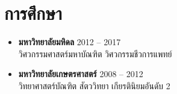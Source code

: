 \section{\sc การศึกษา}

\begin{itemize}[leftmargin=0cm, label={}]

\item {\bf มหาวิทยาลัยมหิดล} \hfill 2012 -- 2017 \\
วิศวกรรมศาสตร์มหาบัณฑิต วิศวกรรมชีวการแพทย์

\item {\bf มหาวิทยาลัยเกษตรศาสตร์} \hfill 2008 -- 2012 \\
วิทยาศาสตร์บัณฑิต สัตววิทยา เกียรตินิยมอันดับ 2

\end{itemize}
